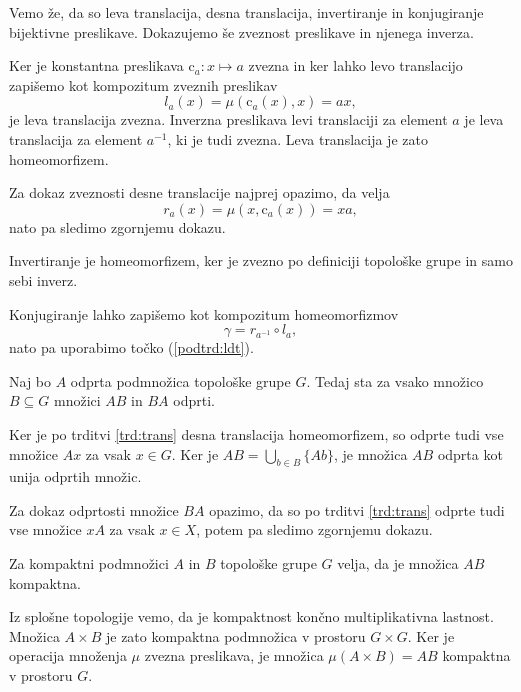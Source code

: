 \documentclass[mat1]{fmfdelo}
\begin{document}
\begin{dokaz}
Vemo že, da so leva translacija, desna translacija, invertiranje in konjugiranje bijektivne preslikave. Dokazujemo še zveznost pre\-sli\-ka\-ve in njenega inverza.

Ker je konstantna preslikava $\text{c}_a\colon x \mapsto a$ zvezna in ker
lahko levo translacijo zapišemo kot kompozitum zveznih preslikav \[l_a(x) = \mu(\text{c}_a(x), x) = ax,\]
je leva translacija zvezna. Inverzna preslikava levi translaciji za element $a$ je leva translacija za element $a^{-1}$, ki je tudi zvezna. Leva translacija je zato homeomorfizem.

Za dokaz zveznosti desne translacije najprej opazimo, da velja
\[r_a(x) = \mu(x, \text{c}_a(x)) = xa,\]
nato pa sledimo zgornjemu dokazu.

Invertiranje je homeomorfizem, ker je zvezno po definiciji topološke grupe in samo sebi inverz.

Konjugiranje lahko zapišemo kot kompozitum homeomorfizmov \[\gamma = r_{a^{-1}} \circ l_a,\]
nato pa uporabimo točko (\ref{podtrd:ldt}).
\end{dokaz}

\begin{trditev}\label{trd:prododp}
Naj bo $A$ odprta podmnožica topološke grupe $G$. Tedaj sta za vsako množico $B \subseteq G$ množici $AB$ in $BA$ odprti.
\end{trditev}

\begin{dokaz}
Ker je po trditvi \ref{trd:trans} desna translacija homeomorfizem, so odprte tudi vse množice $Ax$ za vsak $x \in G$. Ker je $AB = \bigcup_{b \in B}\lbrace Ab\rbrace$, je množica $AB$ odprta kot unija odprtih množic.

Za dokaz odprtosti množice $BA$ opazimo, da so po trditvi \ref{trd:trans} odprte tudi vse množice $xA$ za vsak $x \in X$, potem pa sledimo zgornjemu dokazu.
\end{dokaz}

\begin{trditev}\label{trd:prodkomp}
Za kompaktni podmnožici $A$ in $B$ topološke grupe $G$ velja, da je množica $AB$ kompaktna.
\end{trditev}

\begin{dokaz}
Iz splošne topologije vemo, da je kompaktnost končno multiplikativna lastnost. Množica $A \times B$ je zato kompaktna podmnožica v prostoru $G \times G$. Ker je operacija množenja $\mu$ zvezna preslikava, je množica $\mu (A \times B) = AB$ kompaktna v prostoru $G$.
\end{dokaz}
\end{document}
